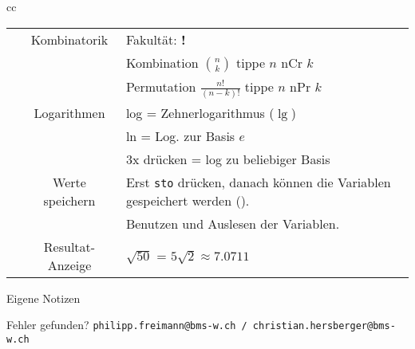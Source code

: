 \begin{tabular}{cc}
\begin{tabular}{c|c|p{80mm}}
\tiprobutton{ncrnpr}       &Kombinatorik      &  Fakultät: {\color{red}\textbf{!}}\\
                           &                  &  Kombination $n \choose k$ tippe $n$ nCr $k$\\
                           &                  &  Permutation $\frac{n!}{(n-k)!}$ tippe $n$ nPr $k$\\\hline
\tiprobutton{ln_log}       &  Logarithmen     &  log = Zehnerlogarithmus ($\lg$)\\
                           &                  &  ln  = Log. zur Basis $e$\\
                           &                  &  3x drücken = log zu beliebiger Basis\\\hline
\tiprobutton{sto_recall}   & Werte speichern  &  Erst \texttt{sto} drücken, danach können die Variablen gespeichert werden (\tiprobutton{xyzabcd}). \\\hline
\tiprobutton{xyzabcd}      &                  & Benutzen und Auslesen der Variablen.\\\hline
\tiprobutton{approx}       & Resultat-Anzeige  & $\sqrt{50}$ = $5\sqrt{2} \approx 7.0711$
\end{tabular}
\end{tabular}

\headerUndFooterJedeSeite{}

%
\noTRAINER{\vspace{15mm}}%
%
%
\headerUndFooterJedeSeite{}
\newpage
\headerUndFooterJedeSeite{}


Eigene Notizen\\

%
%
%
\vspace{5mm}

Fehler gefunden? \texttt{philipp.freimann@bms-w.ch / christian.hersberger@bms-w.ch}

\tiny{\versionsnummerFoSa}




